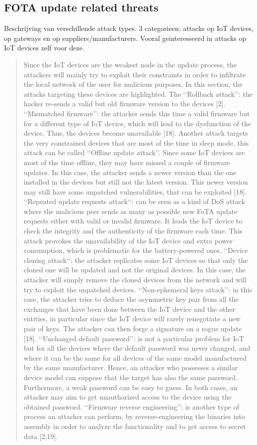 \subsection{FOTA update related threats}
Beschrijving van verschillende attack types. 3 categorieen: attacks op IoT devices, op gateways en op suppliers/manufacturers. Vooral geinteresseerd in attacks op IoT devices zelf voor deze. \begin{quote}
    Since the IoT devices are the weakest node in the update process, the attackers will mainly try to exploit their constraints in order
to infiltrate the local network of the user for malicious purposes. In this section, the attacks targeting these devices are highlighted.
The ‘‘Rollback attack’’: the hacker re-sends a valid but old firmware version to the devices [2]. ‘‘Mismatched firmware’’: the
attacker sends this time a valid firmware but for a different type of IoT device, which will lead to the dysfunction of the device. Thus,
the devices become unavailable [18]. Another attack targets the very constrained devices that are most of the time in sleep mode, this
attack can be called ‘‘Offline update attack’’. Since some IoT devices are most of the time offline, they may have missed a couple of
firmware updates. In this case, the attacker sends a newer version than the one installed in the devices but still not the latest version.
This newer version may still have some unpatched vulnerabilities, that can be exploited [18]. ‘‘Repeated update requests attack‘‘:
can be seen as a kind of DoS attack where the malicious peer sends as many as possible new FoTA update requests either with
valid or invalid firmware. It leads the IoT device to check the integrity and the authenticity of the firmware each time. This attack
provokes the unavailability of the IoT device and extra power consumption, which is problematic for the battery-powered ones.
‘‘Device cloning attack‘‘: the attacker replicates some IoT devices so that only the cloned one will be updated and not the original
devices. In this case, the attacker will simply remove the cloned devices from the network and will try to exploit the unpatched
devices. ‘‘Non-ephemeral keys attack’’: in this case, the attacker tries to deduce the asymmetric key pair from all the exchanges
that have been done between the IoT device and the other entities, in particular since the IoT device will rarely renegotiate a new
pair of keys. The attacker can then forge a signature on a rogue update [18]. ‘‘Unchanged default password’’: is not a particular
problem for IoT but for all the devices where the default password was never changed, and where it can be the same for all devices
of the same model manufactured by the same manufacturer. Hence, an attacker who possesses a similar device model can suppose
that the target has also the same password. Furthermore, a weak password can be easy to guess. In both cases, an attacker may aim
to get unauthorized access to the device using the obtained password. ‘‘Firmware reverse engineering’’: is another type of process
an attacker can perform, by reverse-engineering the binaries into assembly in order to analyze the functionality and to get access
to secret data [2,19].
\end{quote}

